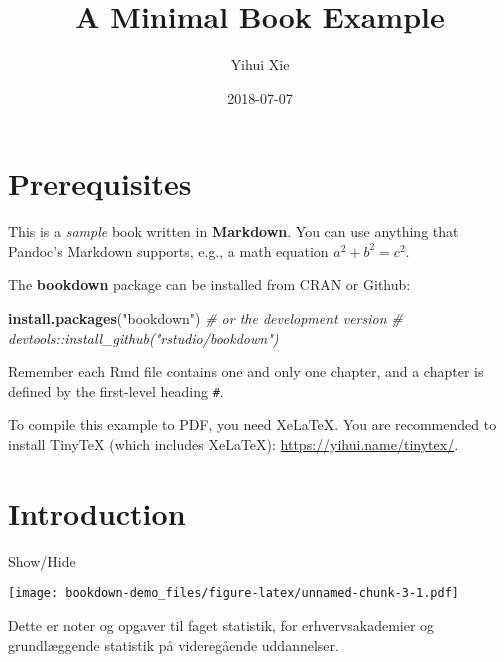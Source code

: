 \documentclass[]{book}
\title{A Minimal Book Example}
\author{Yihui Xie}
\date{2018-07-07}
\newenvironment{Shaded}{\begin{snugshade}}{\end{snugshade}}
\newcommand{\CommentTok}[1]{\textcolor[rgb]{0.56,0.35,0.01}{\textit{#1}}}
\newcommand{\KeywordTok}[1]{\textcolor[rgb]{0.13,0.29,0.53}{\textbf{#1}}}
\newcommand{\NormalTok}[1]{#1}
\newcommand{\OperatorTok}[1]{\textcolor[rgb]{0.81,0.36,0.00}{\textbf{#1}}}
\newcommand{\StringTok}[1]{\textcolor[rgb]{0.31,0.60,0.02}{#1}}
\theoremstyle{definition}
\theoremstyle{definition}
\theoremstyle{definition}
\theoremstyle{remark}
\begin{document}
\maketitle

{
\setcounter{tocdepth}{1}
\tableofcontents
}
\hypertarget{prerequisites}{%
\chapter{Prerequisites}\label{prerequisites}}

This is a \emph{sample} book written in \textbf{Markdown}. You can use
anything that Pandoc's Markdown supports, e.g., a math equation
\(a^2 + b^2 = c^2\).

The \textbf{bookdown} package can be installed from CRAN or Github:

\begin{Shaded}
\begin{Highlighting}[]
\KeywordTok{install.packages}\NormalTok{(}\StringTok{"bookdown"}\NormalTok{)}
\CommentTok{# or the development version}
\CommentTok{# devtools::install_github("rstudio/bookdown")}
\end{Highlighting}
\end{Shaded}

Remember each Rmd file contains one and only one chapter, and a chapter
is defined by the first-level heading \texttt{\#}.

To compile this example to PDF, you need XeLaTeX. You are recommended to
install TinyTeX (which includes XeLaTeX):
\url{https://yihui.name/tinytex/}.

\hypertarget{intro}{%
\chapter{Introduction}\label{intro}}

Show/Hide

\hypertarget{BlockName}{}
\begin{Shaded}
\end{Shaded}

\texttt{[image: bookdown-demo\_files/figure-latex/unnamed-chunk-3-1.pdf]}

Dette er noter og opgaver til faget statistik, for erhvervsakademier og
grundlæggende statistik på videregående uddannelser.
\end{document}
